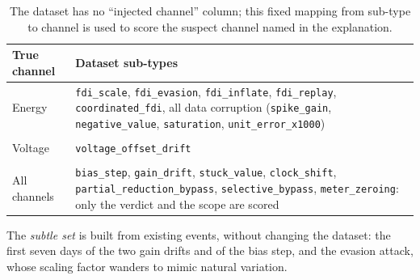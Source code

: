 \documentclass[11pt,a4paper]{article}
\begin{document}
\begin{table}[H]
\centering
\small
\begin{tabularx}{\textwidth}{@{}>{\raggedright\arraybackslash}p{2.4cm}L@{}}
\toprule
\textbf{True channel} & \textbf{Dataset sub-types} \\
\midrule
Energy & \texttt{fdi\_scale}, \texttt{fdi\_evasion}, \texttt{fdi\_inflate}, \texttt{fdi\_replay}, \texttt{coordinated\_fdi}, all data corruption (\texttt{spike\_gain}, \texttt{negative\_value}, \texttt{saturation}, \texttt{unit\_error\_x1000}) \\ \\
Voltage & \texttt{voltage\_offset\_drift} \\ \\
All channels & \texttt{bias\_step}, \texttt{gain\_drift}, \texttt{stuck\_value}, \texttt{clock\_shift}, \texttt{partial\_reduction\_bypass}, \texttt{selective\_bypass}, \texttt{meter\_zeroing}: only the verdict and the scope are scored \\
\bottomrule
\end{tabularx}
\caption{The dataset has no ``injected channel'' column; this fixed mapping from sub-type to channel is used to
score the suspect channel named in the explanation.}
\label{tab:channels}
\end{table}

The \emph{subtle set} is built from existing events, without changing the dataset: the first seven days of
the two gain drifts and of the bias step, and the evasion attack, whose scaling factor wanders to mimic
natural variation.
\end{document}
